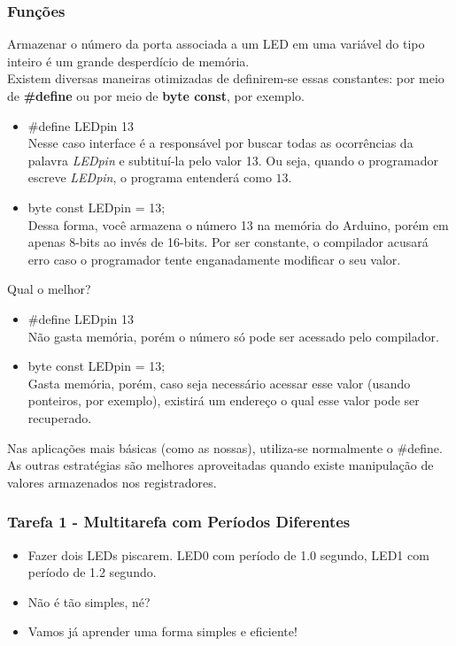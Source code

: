 \documentclass{beamer}
\begin{document}
\begin{frame}
	\frametitle{Funç\~oes}
	Armazenar o número da porta associada a um LED em uma variável do tipo inteiro é um grande desperdício de memória.\\[5pt]
	Existem diversas maneiras otimizadas de definirem-se essas constantes: por meio de \textbf{\#define} ou por meio de \textbf{byte const}, por exemplo.\\[5pt]
	\begin{itemize}
		\item \#define LEDpin 13 \\[5pt]
		Nesse caso interface é a responsável por buscar todas as ocorrências da palavra \textit{LEDpin} e subtituí-la pelo valor 13. Ou seja, quando o programador escreve \textit{LEDpin}, o programa entenderá como $13$.
		\item byte const LEDpin = 13; \\[5pt]
		Dessa forma, você armazena o número 13 na memória do Arduino, porém em apenas 8-bits ao invés de 16-bits. Por ser constante, o compilador acusará erro caso o programador tente enganadamente modificar o seu valor.
	\end{itemize}
\end{frame}

\begin{frame}
Qual o melhor?
	\begin{itemize}
		\item \#define LEDpin 13 \\[5pt]
		Não gasta memória, porém o número só pode ser acessado pelo compilador.
		\item byte const LEDpin = 13; \\[5pt]
		Gasta memória, porém, caso seja necessário acessar esse valor (usando ponteiros, por exemplo), existirá um endereço o qual esse valor pode ser recuperado.
	\end{itemize}
	Nas aplicações mais básicas (como as nossas), utiliza-se normalmente o \#define. As outras estratégias são melhores aproveitadas quando existe manipulação de valores armazenados nos registradores.
\end{frame}

\begin{frame}
	\frametitle{Tarefa 1 - Multitarefa com Períodos Diferentes}
	\begin{itemize}
	\item<1-> Fazer dois LEDs piscarem. LED0 com período de 1.0 segundo, LED1 com período de 1.2 segundo.
	\item<2-> Não é tão simples, né?
	\item<3-> Vamos já aprender uma forma simples e eficiente!
	\end{itemize}
\end{frame}
\end{document}
